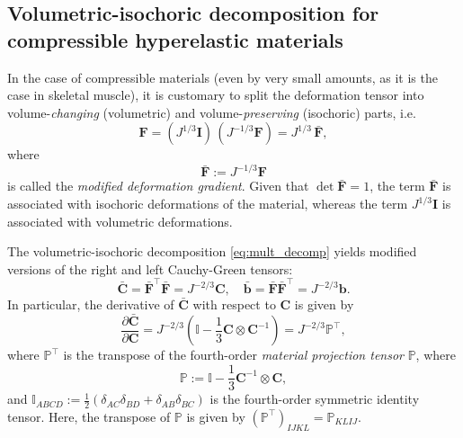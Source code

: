 \documentclass{sfuthesis}
\numberwithin{equation}{section}
\numberwithin{figure}{chapter}
\numberwithin{table}{chapter}
\theoremstyle{definition}
\def\*#1{{\mathbf{#1}}} %
\newcommand{\pder}[2]{\dfrac{\partial #1}{\partial #2}}
\newcommand{\T}{\top}
\renewcommand{\P}{\mathbb{P}}
\begin{document}
\subsection{Volumetric-isochoric decomposition for compressible hyperelastic materials}
\label{sec:vol_isochoric_decomposition}

In the case of compressible materials (even by very small amounts, as it is the case in skeletal muscle), it is customary to split the deformation tensor into volume-\textit{changing} (volumetric) and volume-\textit{preserving} (isochoric) parts, i.e.
\begin{equation} \label{eq:mult_decomp}
\*F = (J^{1/3} \*I)  \, (J^{-1/3} \*F) = J^{1/3} \, \bar{\*F},
\end{equation}
where
\begin{equation}
    \bar{\*F} := J^{-1/3} \*F
\end{equation}
is called the \textit{modified deformation gradient}. Given that $\det\bar{\*F} = 1$, the term $\bar{\*F}$ is associated with isochoric deformations of the material, whereas the term $J^{1/3}\*I$ is associated with volumetric deformations.

The volumetric-isochoric decomposition \eqref{eq:mult_decomp} yields modified versions of the right and left Cauchy-Green tensors:
\begin{equation}
\bar{\*C} = \bar{\*F}^\T \bar{\*F} = J^{-2/3} \*C, \quad \bar{\*b} = \bar{\*F} \bar{\*F}^\T = J^{-2/3} \*b.
\end{equation}
In particular, the derivative of $\bar{\*C}$ with respect to $\*C$ is given by
\begin{equation} \label{eq:der_cbar_c}
\pder{\bar{\*C}}{\*C} = J^{-2/3} \left( \mathbb{I} - \dfrac{1}{3}\*C \otimes \*C^{-1} \right) = J^{-2/3} \P^\T,
\end{equation}
where $\P^\T$ is the transpose of the fourth-order \textit{material projection tensor} $\P$, where 
\begin{equation} \label{eq:def_projection_material}
\P := \mathbb{I} - \dfrac{1}{3}\*C^{-1} \otimes \*C,
\end{equation}
and $\mathbb{I}_{ABCD} := \frac{1}{2} \left( \delta_{AC} \delta_{BD} + \delta_{AB} \delta_{BC} \right)$ is the fourth-order symmetric identity tensor. Here, the transpose of $\P$ is given by $(\P^\top)_{IJKL} = \P_{KLIJ}$.
\end{document}
